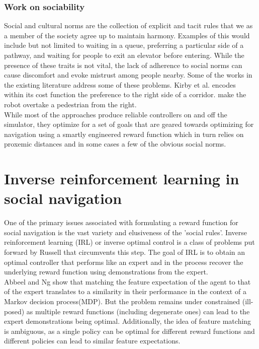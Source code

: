 \subsubsection{Work on sociability}
Social and cultural norms are the collection of explicit and tacit rules that we as a member of the society agree up to maintain harmony. Examples of this would include but not limited to waiting in a queue, preferring a particular side of a pathway, and waiting for people to exit an elevator before entering. While the presence of these traits is not vital, the lack of adherence to social norms can cause discomfort and evoke mistrust among people nearby. Some of the works in the existing literature address some of these problems. Kirby et al. \cite{kirby_companion_2009} encodes within its cost function the preference to the right side of a corridor. \cite{pandey_alami_robot_guide_2009} make the robot overtake a pedestrian from the right.\\

While most of the approaches produce reliable controllers on and off the simulator, they optimize for a set of goals that are geared towards optimizing for navigation using a smartly engineered reward function which in turn relies on proxemic distances and in some cases a few of the obvious social norms.\\

\section{Inverse reinforcement learning in social navigation}
One of the primary issues associated with formulating a reward function for social navigation is the vast variety and elusiveness of the 'social rules'. Inverse reinforcement learning (IRL) or inverse optimal control is a class of problems put forward by Russell \cite{russel_irl_1998} that circumvents this step. The goal of IRL is to obtain an optimal controller that performs like an expert and in the process recover the underlying reward function using demonstrations from the expert. \\

Abbeel and Ng \cite{abbeel_apprenticeshiplearning_2004} show that matching the feature expectation of the agent to that of the expert translates to a similarity in their performance in the context of a Markov decision process(MDP). But the problem remains under constrained (ill-posed) as multiple reward functions (including degenerate ones) can lead to the expert demonstrations being optimal. Additionally, the idea of feature matching is ambiguous, as a single policy can be optimal for different reward functions and different policies can lead to similar feature expectations. \\


